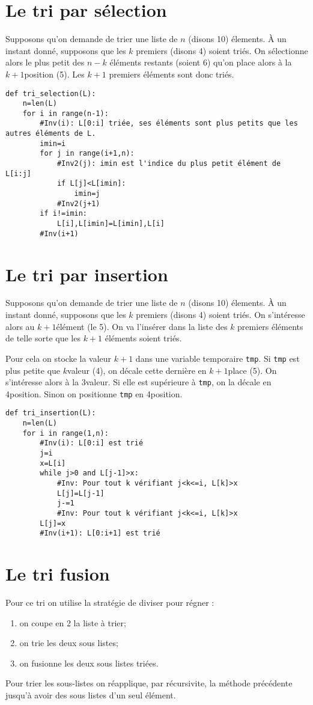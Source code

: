 \section{Le tri par sélection}

Supposons qu'on demande de trier une liste de $n$ (disons 10) élements. À un instant donné, supposons que les $k$ premiers (disons 4) soient triés. On sélectionne alors le plus petit des $n-k$ éléments restants (soient 6) qu'on place alors à la $k+1$\ieme position (5\ieme). Les $k+1$ premiers éléments sont donc triés. 

\begin{lstlisting}	
def tri_selection(L):
    n=len(L)
    for i in range(n-1):
        #Inv(i): L[0:i] triée, ses éléments sont plus petits que les autres éléments de L.
        imin=i
        for j in range(i+1,n):
            #Inv2(j): imin est l'indice du plus petit élément de L[i:j]
            if L[j]<L[imin]:
                imin=j
            #Inv2(j+1)
        if i!=imin:
            L[i],L[imin]=L[imin],L[i]
        #Inv(i+1)
\end{lstlisting}	


\section{Le tri par insertion}
Supposons qu'on demande de trier une liste de $n$ (disons 10) élements. À un instant donné, supposons que les $k$ premiers (disons 4) soient triés. On s'intéresse alors au $k+1$\ieme élément (le 5\ieme). On va l'insérer dans la liste des $k$ premiers éléments de telle sorte que les  $k+1$ éléments soient triés. 

Pour cela on stocke la valeur $k+1$ dans une variable temporaire \texttt{tmp}. Si \texttt{tmp} est plus petite que $k$\ieme valeur (4\ieme), on décale cette dernière en $k+1$\ieme place (5\ieme). On s'intéresse alors à la 3\ieme valeur. Si elle est supérieure à \texttt{tmp}, on la décale en 4\ieme position. Sinon on positionne \texttt{tmp} en 4\ieme position. 
\begin{lstlisting}	
def tri_insertion(L):
    n=len(L)
    for i in range(1,n):
        #Inv(i): L[0:i] est trié
        j=i
        x=L[i]
        while j>0 and L[j-1]>x:
            #Inv: Pour tout k vérifiant j<k<=i, L[k]>x
            L[j]=L[j-1]
            j-=1
            #Inv: Pour tout k vérifiant j<k<=i, L[k]>x
        L[j]=x
        #Inv(i+1): L[0:i+1] est trié
\end{lstlisting}	

\section{Le tri fusion}
Pour ce tri on utilise la stratégie de diviser pour régner : 
\begin{enumerate}
\item on coupe en 2 la liste à trier;
\item on trie les deux sous listes;
\item on fusionne les deux sous listes triées. 
\end{enumerate}
Pour trier les sous-listes on réapplique, par récursivite, la méthode précédente jusqu'à avoir des sous listes d'un seul élément. 

